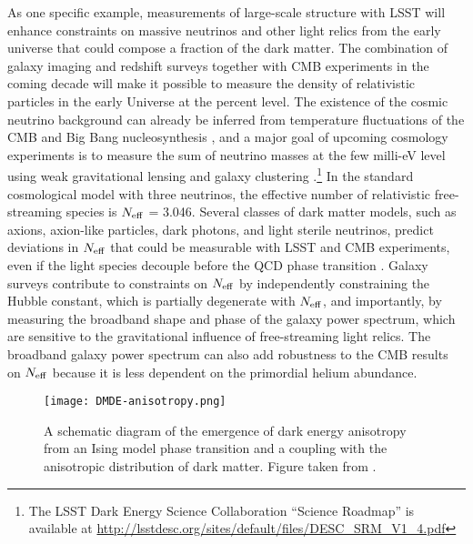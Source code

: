 As one specific example, measurements of large-scale structure with LSST will enhance constraints on massive neutrinos and other light relics from the early universe that could compose a fraction of the dark matter. The combination of galaxy imaging and redshift surveys together with CMB experiments in the coming decade will make it possible to measure the density of relativistic particles in the early Universe at the percent level. The existence of the cosmic neutrino background can already be inferred from temperature fluctuations of the CMB \citep{Planck:2018_cosmo_params} and Big Bang nucleosynthesis \citep{Cooke:2018}, and a major goal of upcoming cosmology experiments is to measure the sum of neutrino masses at the few milli-eV level using weak gravitational lensing and galaxy clustering \citep[e.g.,][]{CMB-S4:2016,DESI:2016,Mishra-Sharma:2018}.\footnote{The LSST Dark Energy Science Collaboration ``Science Roadmap'' is available at \url{http://lsstdesc.org/sites/default/files/DESC_SRM_V1_4.pdf}} In the standard cosmological model with three neutrinos, the effective number of relativistic free-streaming species is $N_{\rm eff}$ = 3.046. Several classes of dark matter models, such as axions, axion-like particles, dark photons, and light sterile neutrinos, predict deviations in $N_{\rm eff}$ that could be measurable with LSST and CMB experiments, even if the light species decouple before the QCD phase transition \citep{Font-Ribera:2014,Baumann:2018}. Galaxy surveys contribute to constraints on $N_{\rm eff}$ by independently constraining the Hubble constant, which is partially degenerate with $N_{\rm eff}$, and importantly, by measuring the broadband shape and phase of the galaxy power spectrum, which are sensitive to the gravitational influence of free-streaming light relics. The broadband galaxy power spectrum can also add robustness to the CMB results on $N_{\rm eff}$ because it is less dependent on the primordial helium abundance.

\begin{figure}[t]
\centering
\texttt{[image: DMDE-anisotropy.png]}
\caption{A schematic diagram of the emergence of dark energy anisotropy from an Ising model phase transition and a coupling with the anisotropic distribution of dark matter. Figure taken from \citet{1810.11007}.}
\label{fig:DMDEmap}
\end{figure}

